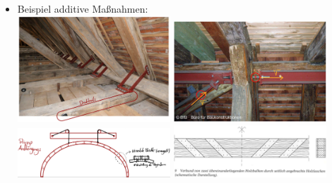\documentclass[fleqn,twoside]{article}
\begin{document}
\begin{itemize}
\begin{itemize}
            \end{itemize}
        \item Beispiel additive Maßnahmen:\\
            \includegraphics[width=0.45\textwidth]{Grafiken/Denkmalpflegerische Arbeit/Additive Massnahmen/Aufhaengung Decke und Ersatz Lager Vorholz 1.png}
            \includegraphics[width=0.45\textwidth]{Grafiken/Denkmalpflegerische Arbeit/Additive Massnahmen/Additive Massnahmen - Zugkraefte Stuhlsaeule aufnehmen.png}\\
            \includegraphics[width=0.45\textwidth]{Grafiken/Denkmalpflegerische Arbeit/Additive Massnahmen/Aufhaengung Decke und Ersatz Lager Vorholz 2.png}
            \includegraphics[width=0.45\textwidth]{Grafiken/Denkmalpflegerische Arbeit/Additive Massnahmen/Verbund durch Laschen.png} 
    \end{itemize}
\end{document}
